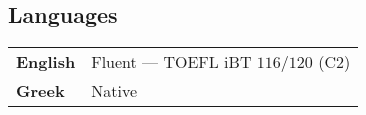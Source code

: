 \documentclass[margin,12pt]{resume}
\newcommand{\subsectionVSpace}{\vspace{3.5ex}\xspace}
\newcommand{\sectionVSpace}{\vspace{1ex}\xspace} %
\newcommand{\sectionVSpaceCorrection}{\vspace{-3.5ex}} %
\newenvironment{rSubsection}{}{\par\subsectionVSpace}
\newenvironment{rSection}[1]{\sectionVSpaceCorrection\section{#1}\xspace}{\sectionVSpace\par}
\begin{document}
\begin{resume}
    \begin{rSection}{Languages}
        \begin{rSubsection}
            \begin{tabular}{@{} >{\bfseries}l l @{}}
                English & Fluent --- TOEFL iBT \( 116/120 \) (C2) \\
                Greek   & Native                                  \\
            \end{tabular}
        \end{rSubsection}
    \end{rSection}



\end{resume}
\end{document}

